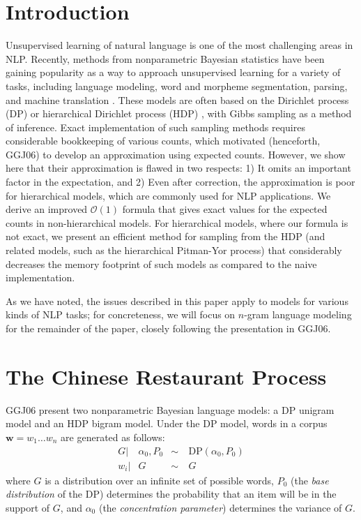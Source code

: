 \documentclass[11pt]{article}
\begin{document}
\section{Introduction}
Unsupervised learning of natural language is one of the most challenging areas in NLP.  
Recently, methods from nonparametric Bayesian statistics have been gaining popularity as a way to approach unsupervised learning for a variety of tasks, including language modeling, word and morpheme segmentation, parsing, and machine translation \cite{teh06hdp,goldwater06,goldwater06interpolating,liang07hdppcfg,finkel07infinite,denero08sampling}. %
These models are often based on the Dirichlet process (DP) \cite{ferguson73} or hierarchical Dirichlet process (HDP) \cite{teh06hdp}, with Gibbs sampling as a method of inference.  
Exact implementation of such sampling methods requires considerable bookkeeping of various counts, which motivated  (henceforth, GGJ06) to develop an approximation using expected counts.  
However, we show here that their approximation is flawed in two respects: 1) It omits an important factor in the expectation, and 2) Even after correction, the approximation is poor for hierarchical models, which are commonly used for NLP applications.  
We derive an improved  
$\mathcal{O}(1)$ formula that gives exact values for the expected counts in non-hierarchical models.  For hierarchical models, where our formula is not exact, 
we present an efficient method for sampling from the HDP (and related
models, such as the hierarchical Pitman-Yor process) that considerably decreases
the memory footprint of such models as compared to the naive
implementation.

As we have noted, the issues described in this paper apply to models for various kinds of NLP tasks; for concreteness, we will focus on $n$-gram language modeling for the remainder of the paper, closely following the presentation in GGJ06.

\vspace{-0.05in}
\section{The Chinese Restaurant Process}
GGJ06 present two nonparametric Bayesian language models: a DP unigram
model and an HDP bigram model. Under the DP model, words in a corpus
$\mathbf{w} = w_1 \ldots w_n$ are generated as follows: 
\begin{align}
\nonumber G | & \alpha_0, P_0 & \sim & ~ \mbox{DP}(\alpha_0,P_0) \\
\nonumber w_i | & G & \sim & ~ G 
\end{align}
where $G$ is a distribution over an infinite set of possible words,
$P_0$ (the {\em base distribution} of the DP) determines the
probability that an item will be in the support of $G$, and $\alpha_0$
(the {\em concentration parameter}) determines the variance of $G$.
\end{document}
